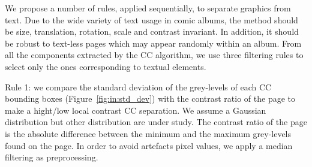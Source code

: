 


We propose a number of rules, applied sequentially, to separate graphics from text. Due to the wide variety of text usage in comic albums, the method should be size, translation, rotation, scale and contrast invariant. In addition, it should be robust to text-less pages which may appear randomly within an album. From all the components extracted by the CC algorithm, we use three filtering rules to select only the ones corresponding to textual elements.




Rule 1: we compare the standard deviation of the grey-levels of each CC bounding boxes (Figure~\ref{fig:in:std_dev}) with the contrast ratio of the page to make a hight/low local contrast CC separation. We assume a Gaussian distribution but other distribution are under study. The contrast ratio of the page is the absolute difference between the minimum and the maximum grey-levels found on the page. In order to avoid artefacts pixel values, we apply a median filtering as preprocessing.%

